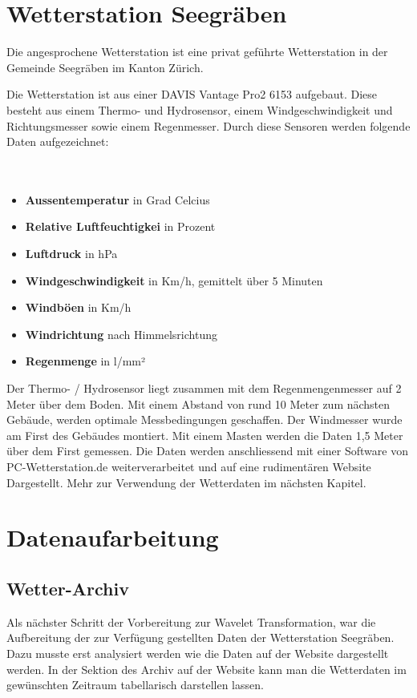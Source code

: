 \begin{refsection}
\section{Wetterstation Seegräben}

Die  angesprochene Wetterstation ist eine privat geführte Wetterstation in der Gemeinde Seegräben im Kanton Zürich.

Die Wetterstation ist aus einer DAVIS Vantage Pro2 6153 aufgebaut.
Diese besteht aus einem Thermo- und  Hydrosensor, einem Windgeschwindigkeit und Richtungsmesser sowie einem Regenmesser. 
Durch diese Sensoren werden folgende Daten aufgezeichnet:
\\
\\
\\


\begin{itemize}
	\item \textbf{Aussentemperatur} in Grad Celcius
	\item \textbf{Relative Luftfeuchtigkei} in Prozent
	\item \textbf{Luftdruck} in hPa
	\item \textbf{Windgeschwindigkeit} in Km/h, gemittelt über 5 Minuten
	\item \textbf{Windböen} in Km/h
	\item \textbf{Windrichtung} nach Himmelsrichtung
	\item \textbf{Regenmenge} in l/mm²
\end{itemize}	


Der Thermo- / Hydrosensor liegt zusammen mit dem Regenmengenmesser auf 2 Meter über dem Boden.
Mit einem Abstand von rund 10 Meter zum nächsten Gebäude, werden optimale Messbedingungen geschaffen.
Der Windmesser wurde am First des Gebäudes montiert.
Mit einem Masten werden die Daten 1,5 Meter über dem First gemessen.\cite{online:wss}
Die Daten werden anschliessend mit einer Software von PC-Wetterstation.de weiterverarbeitet und auf eine rudiment\"aren Website Dargestellt.
Mehr zur Verwendung der Wetterdaten im n\"achsten Kapitel.

\section{Datenaufarbeitung}
\subsection{Wetter-Archiv}
Als n\"achster Schritt der Vorbereitung zur Wavelet Transformation, war die Aufbereitung der zur Verf\"ugung gestellten Daten der Wetterstation Seegr\"aben.
Dazu musste erst analysiert werden wie die Daten auf der Website dargestellt werden.
In der Sektion des Archiv auf der Website kann man die Wetterdaten im gew\"unschten Zeitraum tabellarisch darstellen lassen.

\end{refsection}
